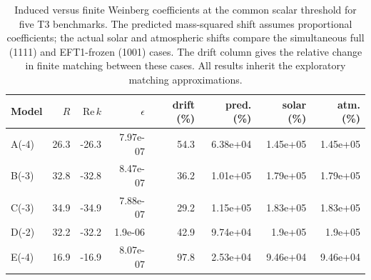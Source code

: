 \begin{table}[htbp]
\centering
\small
\begin{tabular}{lrrrrrrr}
\hline
Model & $R$ & $\mathrm{Re}\,k$ & $\epsilon$ & drift (\%) & pred. (\%) & solar (\%) & atm. (\%) \\
\hline
A(-4) & 26.3 & -26.3 & 7.97e-07 & 54.3 & 6.38e+04 & 1.45e+05 & 1.45e+05 \\
B(-3) & 32.8 & -32.8 & 8.47e-07 & 36.2 & 1.01e+05 & 1.79e+05 & 1.79e+05 \\
C(-3) & 34.9 & -34.9 & 7.88e-07 & 29.2 & 1.15e+05 & 1.83e+05 & 1.83e+05 \\
D(-2) & 32.2 & -32.2 & 1.9e-06 & 42.9 & 9.74e+04 & 1.9e+05 & 1.9e+05 \\
E(-4) & 16.9 & -16.9 & 8.07e-07 & 97.8 & 2.53e+04 & 9.46e+04 & 9.46e+04 \\
\hline
\end{tabular}
\caption{Induced versus finite Weinberg coefficients at the common scalar threshold for five T3 benchmarks. The predicted mass-squared shift assumes proportional coefficients; the actual solar and atmospheric shifts compare the simultaneous full (1111) and EFT1-frozen (1001) cases. The drift column gives the relative change in finite matching between these cases. All results inherit the exploratory matching approximations.}
\label{tab:eft1-five-contributions}
\end{table}
